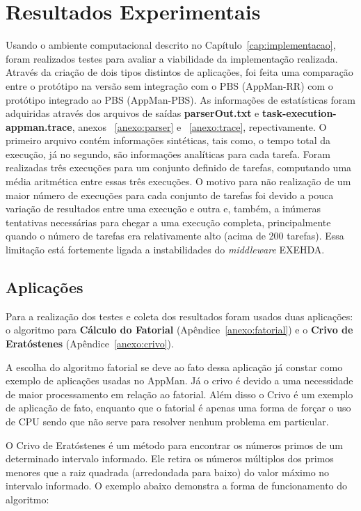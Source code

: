 \chapter{Resultados Experimentais}
\label{cap:resultados}

Usando o ambiente computacional descrito no Capítulo~\ref{cap:implementacao}, foram realizados testes para avaliar a viabilidade da implementação realizada. Através da criação de dois tipos distintos de aplicações, foi feita uma comparação entre o protótipo na versão sem integração com o PBS (AppMan-RR) com o protótipo integrado ao PBS (AppMan-PBS). As informações de estatísticas foram adquiridas através dos arquivos de saídas {\bf parserOut.txt} e {\bf task-execution-appman.trace}, anexos ~\ref{anexo:parser} e ~\ref{anexo:trace}, repectivamente. O primeiro arquivo contém informações sintéticas, tais como, o tempo total da execução, já no segundo, são informações analíticas para cada tarefa. Foram realizadas três execuções para um conjunto definido de tarefas, computando uma média aritmética entre essas três execuções. O motivo para não realização de um maior número de execuções para cada conjunto de tarefas foi devido a pouca variação de resultados entre uma execução e outra e, também, a inúmeras tentativas necessárias para chegar a uma execução completa, principalmente quando o número de tarefas era relativamente alto (acima de 200 tarefas). Essa limitação está fortemente ligada a instabilidades do \emph{middleware} EXEHDA.

\section{Aplicações}

Para a realização dos testes e coleta dos resultados foram usados duas aplicações: o algoritmo para \textbf{Cálculo do Fatorial} (Apêndice~\ref{anexo:fatorial}) e o \textbf{Crivo de Eratóstenes} (Apêndice~\ref{anexo:crivo}).

A escolha do algoritmo fatorial se deve ao fato dessa aplicação já constar como exemplo de aplicações usadas no AppMan. Já o crivo é devido a uma necessidade de maior processamento em relação ao fatorial. Além disso o Crivo é um exemplo de aplicação de fato, enquanto que o fatorial é apenas uma forma de forçar o uso de CPU sendo que não serve para resolver nenhum problema em particular.


O Crivo de Eratóstenes é um método para encontrar os números primos de um determinado intervalo informado. Ele retira os números múltiplos dos primos menores que a raiz quadrada (arredondada para baixo) do valor máximo no intervalo informado. O exemplo abaixo demonstra a forma de funcionamento do algoritmo:


